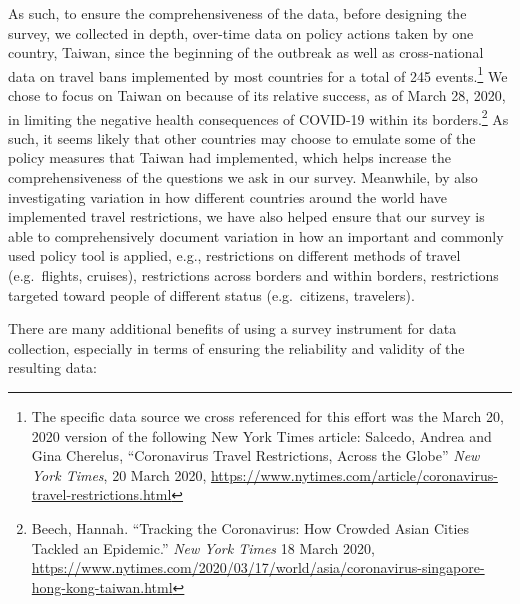 \documentclass[]{article}
\let\rmarkdownfootnote\footnote%
\def\footnote{\protect\rmarkdownfootnote}
\begin{document}
As such, to ensure the comprehensiveness of the data, before designing the survey, we collected in depth, over-time data on policy actions taken by one country, Taiwan, since the beginning of the outbreak as well as cross-national data on travel bans implemented by most countries for a total of 245 events.\footnote{The specific data source we cross referenced for this effort was the March 20, 2020 version of the following New York Times article: Salcedo, Andrea and Gina Cherelus, ``Coronavirus Travel Restrictions, Across the Globe'' \emph{New York Times}, 20 March 2020, \url{https://www.nytimes.com/article/coronavirus-travel-restrictions.html}} We chose to focus on Taiwan on because of its relative success, as of March 28, 2020, in limiting the negative health consequences of COVID-19 within its borders.\footnote{Beech, Hannah. ``Tracking the Coronavirus: How Crowded Asian Cities Tackled an Epidemic.'' \emph{New York Times} 18 March 2020, \url{https://www.nytimes.com/2020/03/17/world/asia/coronavirus-singapore-hong-kong-taiwan.html}} As such, it seems likely that other countries may choose to emulate some of the policy measures that Taiwan had implemented, which helps increase the comprehensiveness of the questions we ask in our survey. Meanwhile, by also investigating variation in how different countries around the world have implemented travel restrictions, we have also helped ensure that our survey is able to comprehensively document variation in how an important and commonly used policy tool is applied, e.g., restrictions on different methods of travel (e.g.~flights, cruises), restrictions across borders and within borders, restrictions targeted toward people of different status (e.g.~citizens, travelers).

There are many additional benefits of using a survey instrument for data collection, especially in terms of ensuring the reliability and validity of the resulting data:
\end{document}
